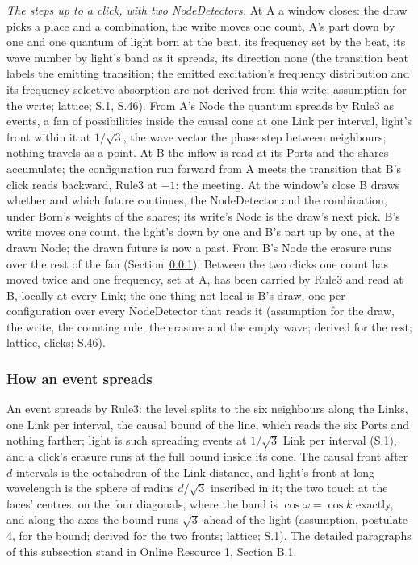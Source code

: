 \documentclass[pdflatex,sn-mathphys-num]{sn-jnl}
\theoremstyle{thmstyleone}
\theoremstyle{thmstyletwo}
\begin{document}
\emph{The steps up to a click, with two NodeDetectors.} At A a window closes: the draw picks a place and a combination, the write moves one count, A's part down by one and one quantum of light born at the beat, its frequency set by the beat, its wave number by light's band as it spreads, its direction none (the transition beat labels the emitting transition; the emitted excitation's frequency distribution and its frequency-selective absorption are not derived from this write; assumption for the write; lattice; S.1, S.46). From A's Node the quantum spreads by Rule3 as events, a fan of possibilities inside the causal cone at one Link per interval, light's front within it at $1 / \sqrt 3$, the wave vector the phase step between neighbours; nothing travels as a point. At B the inflow is read at its Ports and the shares accumulate; the configuration run forward from A meets the transition that B's click reads backward, Rule3 at $-1$: the meeting. At the window's close B draws whether and which future continues, the NodeDetector and the combination, under Born's weights of the shares; its write's Node is the draw's next pick. B's write moves one count, the light's down by one and B's part up by one, at the drawn Node; the drawn future is now a past. From B's Node the erasure runs over the rest of the fan (Section~\ref{sec:spread}). Between the two clicks one count has moved twice and one frequency, set at A, has been carried by Rule3 and read at B, locally at every Link; the one thing not local is B's draw, one per configuration over every NodeDetector that reads it (assumption for the draw, the write, the counting rule, the erasure and the empty wave; derived for the rest; lattice, clicks; S.46).

\subsubsection{How an event spreads}\label{sec:spread}

An event spreads by Rule3: the level splits to the six neighbours along the Links, one Link per interval, the causal bound of the line, which reads the six Ports and nothing farther; light is such spreading events at $1 / \sqrt 3$ Link per interval (S.1), and a click's erasure runs at the full bound inside its cone. The causal front after $d$ intervals is the octahedron of the Link distance, and light's front at long wavelength is the sphere of radius $d / \sqrt 3$ inscribed in it; the two touch at the faces' centres, on the four diagonals, where the band is $\cos\omega = \cos k$ exactly, and along the axes the bound runs $\sqrt 3$ ahead of the light (assumption, postulate 4, for the bound; derived for the two fronts; lattice; S.1). The detailed paragraphs of this subsection stand in Online Resource 1, Section B.1.
\end{document}
